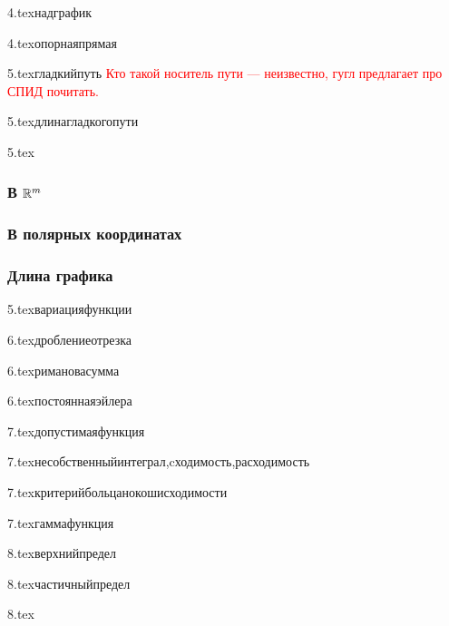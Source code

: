 {4.tex}{надграфик}

{4.tex}{опорнаяпрямая}

{5.tex}{гладкийпуть}
\textcolor{red}{Кто такой носитель пути --- неизвестно, гугл предлагает про СПИД почитать.}

{5.tex}{длинагладкогопути}

{5.tex}{}
\subsubsection{В $\mathbb{R}^m$}
\subsubsection{В полярных координатах}
\subsubsection{Длина графика}

{5.tex}{вариацияфункции}

{6.tex}{дроблениеотрезка}

{6.tex}{римановасумма}

{6.tex}{постояннаяэйлера}

{7.tex}{допустимаяфункция}

{7.tex}{несобственныйинтеграл,cходимость,расходимость}

{7.tex}{критерийбольцанокошисходимости}

{7.tex}{гаммафункция}

{8.tex}{верхнийпредел}

{8.tex}{частичныйпредел}

{8.tex}{}


